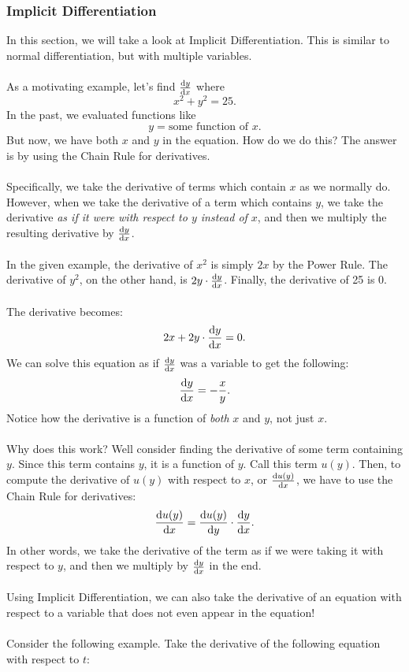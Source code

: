 \documentclass{article}
\begin{document}
\subsubsection{Implicit Differentiation}
In this section, we will take a look at Implicit Differentiation. This is similar to normal differentiation, but with multiple variables. 
\\
\\
As a motivating example, let's find $\diff{y}{x}$ where
\[x^2+y^2=25.\]
In the past, we evaluated functions like
\[y=\text{some function of $x$}.\]
But now, we have both $x$ and $y$ in the equation. How do we do this? The answer is by using the Chain Rule for derivatives. 
\\
\\
Specifically, we take the derivative of terms which contain $x$ as we normally do. However, when we take the derivative of a term which contains $y$, we take the derivative \textit{as if it were with respect to $y$ instead of $x$}, and then we multiply the resulting derivative by $\diff{y}{x}$.
\\
\\
In the given example, the derivative of $x^2$ is simply $2x$ by the Power Rule. The derivative of $y^2$, on the other hand, is $2y\cdot \diff{y}{x}$. Finally, the derivative of 25 is 0. 
\\
\\
The derivative becomes:
\[2x+2y\cdot \diff{y}{x}=0.\]
We can solve this equation as if $\diff{y}{x}$ was a variable to get the following:
\[\diff{y}{x}=-\frac{x}{y}.\]
Notice how the derivative is a function of \textit{both} $x$ and $y$, not just $x$. 
\\
\\
Why does this work? Well consider finding the derivative of some term containing $y$. Since this term contains $y$, it is a function of $y$. Call this term $u(y)$. Then, to compute the derivative of $u(y)$ with respect to $x$, or $\diff{u(y)}{x}$, we have to use the Chain Rule for derivatives:
\[\diff{u(y)}{x}=\diff{u(y)}{y}\cdot \diff{y}{x}.\]
In other words, we take the derivative of the term as if we were taking it with respect to $y$, and then we multiply by $\diff{y}{x}$ in the end.
\\
\\
Using Implicit Differentiation, we can also take the derivative of an equation with respect to a variable that does not even appear in the equation!
\\
\\
Consider the following example. Take the derivative of the following equation with respect to $t$:
\end{document}
